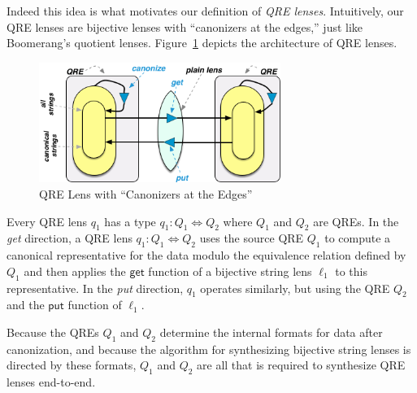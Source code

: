 \documentclass[acmsmall,review,anonymous]{acmart}
\newcommand{\codefont}[1]{\ensuremath{\mathsf{#1}}}
\newcommand{\kw}[1]{\codefont{#1}}
\newcommand{\get}{\ensuremath{\kw{get}}}
\newcommand{\lput}{\ensuremath{\kw{put}}}
\begin{document}
Indeed this idea is what motivates our definition of {\em QRE lenses}.
Intuitively, our QRE lenses are bijective lenses with ``canonizers at the edges,''
just like Boomerang's quotient lenses. 
Figure~\ref{fig:attheedges} depicts the architecture of QRE lenses.
\begin{figure}[t]
\centering
\includegraphics[width=0.7\textwidth]{canonizers-outside}
\caption{QRE Lens with ``Canonizers at the Edges''}
\label{fig:attheedges}
\end{figure}
Every QRE lens $q_1$ has a type $q_1: Q_1 \Leftrightarrow Q_2$ where $Q_1$ and $Q_2$
are QREs. In the {\em get} direction, a QRE lens $q_1: Q_1 \Leftrightarrow Q_2$ uses the
source QRE $Q_1$ to compute a canonical representative for the data modulo the
equivalence relation defined by $Q_1$ and then applies the $\get$ function of a
bijective string lens $\ell_1$ to this representative. In the {\em put} direction, $q_1$
operates similarly, but using the QRE $Q_2$ and the $\lput$ function of
$\ell_1$.

Because the QREs $Q_1$ and $Q_2$ determine the internal formats for data after
canonization, and because the algorithm for synthesizing bijective string lenses is
directed by these formats, $Q_1$ and $Q_2$ are all that is required to
synthesize QRE lenses end-to-end. 
\end{document}
